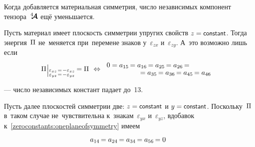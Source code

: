 \begin{otherlanguage}{russian}
Когда добавляется материальная симметрия, число независимых компонент тензора~$\hspace{.08ex}{^4\hspace{-0.72ex}\bm{\mathcal{A}}}\hspace{.08ex}$ ещё уменьшается.

Пусть материал имеет плоскость симметрии упругих свойств ${z = \constant}$.
Тогда энергия~$\Pi$ не~меняется при~перемене знаков у~$\varepsilon_{zx}$ и~$\varepsilon_{zy}$.
А~это возможно лишь если
\begin{equation}\label{zeroconstants:oneplaneofsymmetry}
\potential \hspace{.1ex} \raisemath{-0.2em}{\Bigr\vert}_{\substack{%
\varepsilon_{xz} \hspace{.2ex}=\hspace{.2ex} -\varepsilon_{xz} \\
\varepsilon_{yz} \hspace{.2ex}=\hspace{.2ex} -\varepsilon_{yz}
}} \hspace{-0.2ex} = \potential
\:\,\Leftrightarrow \hspace{-3em}
\begin{array}{c}
0 =
a_{15} \hspace{-0.2ex} = a_{16} \hspace{-0.2ex} = a_{25} \hspace{-0.2ex} = a_{26} \hspace{-0.2ex} =
\\[-0.1em]
\hspace{8em} = a_{35} \hspace{-0.2ex} = a_{36} \hspace{-0.2ex} = a_{45} \hspace{-0.2ex} = a_{46}
\end{array}
\vspace{.1em}\end{equation}

\noindent
--- число независимых констант падает до~13.

Пусть далее плоскостей симметрии две: ${z = \constant}$ и ${y = \constant}$.
Поскольку~$\Pi$ в~таком случае не~чувствительна к~знакам~$\varepsilon_{yx}$ и~$\varepsilon_{yz}$, вдобавок к~\eqref{zeroconstants:oneplaneofsymmetry} имеем

\nopagebreak\vspace{-0.22em}\begin{equation}\label{zeroconstants:2orthogonalplanesofsymmetry:orthotropic}
a_{14} \hspace{-0.2ex} = a_{24} \hspace{-0.2ex} = a_{34} \hspace{-0.2ex} = a_{56} \hspace{-0.2ex} = 0
\end{equation}


\end{otherlanguage}
